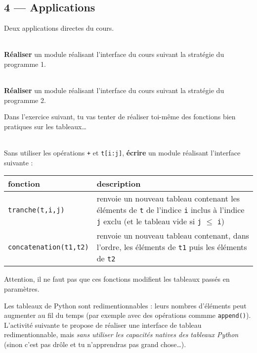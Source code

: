 \documentclass[a4paper,17pt]{extarticle}
\newenvironment{eleve}%
{\begin{activite}\color{noiramu}\\[-0.5cm]}
{\end{activite}}
\begin{document}
    \hypertarget{applications}{%
\subsection{4 --- Applications}\label{applications}}

    Deux applications directes du cours.
\begin{eleve}
    \textbf{Réaliser} un module réalisant l'interface du cours suivant la
stratégie du programme 1.
        
        \end{eleve}\begin{eleve}
    \textbf{Réaliser} un module réalisant l'interface du cours suivant la
stratégie du programme 2.
        
        \end{eleve}
    Dans l'exercice suivant, tu vas tenter de réaliser toi-même des
fonctions bien pratiques sur les tableaux\ldots{}
\begin{eleve}
    Sans utiliser les opérations \texttt{+} et \texttt{t{[}i:j{]}},
\textbf{écrire} un module réalisant l'interface suivante :

\begin{longtable}[]{@{}ll@{}}
\toprule
\begin{minipage}[b]{0.47\columnwidth}\raggedright
fonction\strut
\end{minipage} & \begin{minipage}[b]{0.47\columnwidth}\raggedright
description\strut
\end{minipage}\tabularnewline
\midrule
\endhead
\begin{minipage}[t]{0.47\columnwidth}\raggedright
\texttt{tranche(t,i,j)}\strut
\end{minipage} & \begin{minipage}[t]{0.47\columnwidth}\raggedright
renvoie un nouveau tableau contenant les éléments de \texttt{t} de
l'indice \texttt{i} inclus à l'indice \texttt{j} exclu (et le tableau
vide si \texttt{j} \(\leq\) \texttt{i})\strut
\end{minipage}\tabularnewline
\begin{minipage}[t]{0.47\columnwidth}\raggedright
\texttt{concatenation(t1,t2)}\strut
\end{minipage} & \begin{minipage}[t]{0.47\columnwidth}\raggedright
renvoie un nouveau tableau contenant, dans l'ordre, les éléments de
\texttt{t1} puis les éléments de \texttt{t2}\strut
\end{minipage}\tabularnewline
\bottomrule
\end{longtable}

Attention, il ne faut pas que ces fonctions modifient les tableaux
passés en paramètres.
        
        \end{eleve}
    Les tableaux de Python sont redimentionnables : leurs nombres d'éléments
peut augmenter au fil du temps (par exemple avec des opérations commme
\texttt{append()}). L'activité suivante te propose de réaliser une
interface de tableau redimentionnable, mais \emph{sans utiliser les
capacités natives des tableaux Python} (sinon c'est pas drôle et tu
n'apprendras pas grand chose\ldots).
\end{document}
